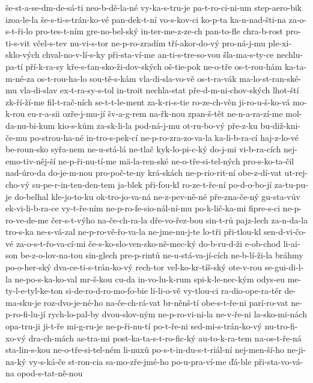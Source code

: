 še-st-a-se-dm-de-sá-ti
neo-b-dě-la-né
vy-ka-s-tru-je
pa-t-ro-ci-ni-um
step-aero-bik
izoa-le-la
še-s-ti-s-trán-ko-vé
pan-dek-t-ní
vo-s-kov-ci
ko-p-ta
ka-n-nad-šti-na
za-o-s-t-ři-lo
pro-tes-t-ním
gre-no-bel-ský
in-ter-me-z-ze-ch
pan-to-fle
chra-b-rost
pro-ti-s-vit
včel-s-tev
nu-vi-s-tor
ne-p-ro-zradím
tří-akor-do-vý
pro-ná-j-mu
ple-xi-sklo-vých
chval-no-v-lí-s-ky
při-sta-ví-me
an-ti-s-tre-so-vou
šla-ma-s-ty-ce
nechlu-pa-tí
pří-k-ra-sy
kře-s-ťan-sko-ži-dov-ských
oš-tie-pok
ne-o-tře
os-t-rou-hám
ka-ta-m-né-za
os-t-rou-ha-lo
sou-tě-s-kám
vla-di-sla-vo-vě
os-t-ra-vák
ma-lo-st-ran-ské-mu
vla-di-slav
ex-t-ra-sy-s-tol
in-troit
nechla-stat
pře-d-m-ni-chov-ských
lhot-ští
zk-ří-ží-me
fil-t-rač-ních
se-t-t-le-ment
za-k-ri-s-tie
ro-ze-ch-věn
ji-ro-u-š-ko-vá
mo-k-rou
eu-r-a-sii
ozře-j-mu-jí
šv-a-g-rem
na-řk-nou
zpan-š-tět
ne-n-a-ra-zí-me
mol-da-nu-bi-kum
kio-s-kům
za-sk-li-la
pod-ná-j-mu
ot-ru-bo-vý
pře-z-ku
bu-diž-kni-če-mu
po-strou-ha-né
in-tro-s-pek-cí
ne-p-ro-zra-zo-va-la
ka-li-b-ra-cí
haj-z-lo-vé
be-roun-sko
syřa-nem
ne-u-stá-lá
ne-tlač
kyk-lo-pi-c-ký
do-j-mi
vi-b-ra-cích
nej-emo-tiv-něj-ší
ne-p-ři-nu-tí-me
mä-la-ren-ské
ne-o-tře-si-tel-ných
pro-s-ko-ta-čil
nad-úro-da
do-je-m-nou
pro-poč-te-ny
krá-skách
ne-p-rio-rit-ní
obe-z-dí-vat
ut-rej-cho-vý
su-pe-r-in-ten-den-tem
ja-blek
při-fou-kl
ro-ze-t-ře-ní
po-d-o-bo-jí
za-tu-pu-je
do-belhal
kle-jo-to-ku
ok-tro-jo-va-ná
ne-z-pev-ně-né
pře-zna-če-ný
gu-sta-vův
ek-vi-li-b-ra-ce
vy-t-ře-ním
ne-p-ro-fe-sio-nál-ní-mu
po-k-lič-ka-mi
fipre-s-ci
ne-p-ro-ve-de-me
čer-s-t-výho
na-če-ch-ra-la
dře-vo-řez-bou
sin-t-rů
pajz-lech
za-n-da-la
tro-s-ka
ne-s-vá-zal
ne-p-ro-vě-řo-va-la
ne-jme-nu-j-te
lo-tři
při-tlou-kl
sen-d-vi-čo-vé
za-o-s-t-řo-va-cí-mi
če-s-ko-slo-ven-sko-ně-mec-ký
do-b-ru-d-ži
e-ob-chod
li-ai-son
be-z-o-lov-na-tou
sin-glech
pre-p-rintů
ne-u-stá-va-jí-cích
ne-b-lí-ži-la
bráhmy
po-o-her-ský
dva-ce-ti-s-trán-ko-vý
rech-tor
veľ-ko-kr-tíš-ský
ote-v-rou
se-gui-di-l-la
ne-po-s-ka-ko-val
mr-š-kou
cu-da
in-vo-lu-k-rum
spi-k-le-nec-kým
odys-eu
me-ty-l-e-tyl-ke-ton
si-de-ro-d-ro-mo-fo-bie
li-li-o-vě
vy-tlou-ci
ra-dio-ope-ra-tér
de-ma-sku-je
roz-dvo-je-né-ho
na-če-ch-rá-vat
br-něnš-tí
obe-s-t-ře-ni
parí-ro-vat
ne-p-ro-fi-lu-jí
rych-lo-pal-by
dvou-slov-ným
ne-p-ro-vi-ni-la
ne-v-ře-ni
la-sko-mi-nách
opa-tru-ji
ji-t-ře
mi-g-ru-je
ne-p-ři-nu-tí
po-t-ře-ni
sed-mi-s-trán-ko-vý
nu-tro-fi-xo-vý
dra-ch-mách
as-tra-mi
post-ka-ta-s-t-ro-fic-ký
au-to-k-ra-tem
na-os-t-ře-ná
sta-lin-s-kou
ne-o-tře-si-tel-ném
li-nuxů
po-s-t-in-du-s-t-riál-ní
nej-men-ší-ho
ne-ji-na-ký
vy-s-ká-če
st-ron-cia
sa-mo-zře-jmé-ho
po-u-pra-ví-me
ďá-ble
při-sta-vo-vá-na
opod-s-tat-ně-nou
